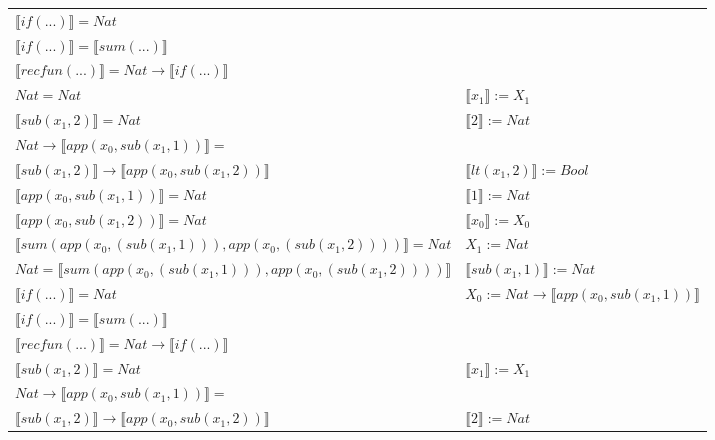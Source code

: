 \begin{exercise}
\begin{description}
\begin{center}
\begin{longtable}[!h]{ | l | l | }
                        $ \llbracket if(...) \rrbracket = Nat$ & \\
                        $ \llbracket if(...) \rrbracket =  \llbracket sum(...) \rrbracket$ & \\
                        $ \llbracket recfun(...) \rrbracket =   Nat  \to  \llbracket if(...) \rrbracket $& \\
                    \hline
                        $Nat = Nat$ &  $ \llbracket x_1 \rrbracket := X_1$ \\
                        $ \llbracket sub(x_1,2) \rrbracket = Nat$ & $ \llbracket 2 \rrbracket := Nat$  \\
                        $Nat \to  \llbracket app(x_0, sub(x_1,1)) \rrbracket = $ & \\
			     $ \llbracket sub(x_1,2) \rrbracket \to  \llbracket app(x_0, sub(x_1,2)) \rrbracket$ & $ \llbracket lt(x_1 , 2) \rrbracket := Bool$  \\
                        $ \llbracket app(x_0, sub(x_1,1)) \rrbracket = Nat$ &  $ \llbracket 1 \rrbracket := Nat$  \\
                        $ \llbracket app(x_0, sub(x_1,2)) \rrbracket = Nat$ & $ \llbracket x_0 \rrbracket := X_0$  \\
                        $ \llbracket sum(app(x_0, (sub(x_1,1))), app(x_0, (sub(x_1,2))))  \rrbracket = Nat$ &  $X_1 := Nat$ \\
                        $Nat =  \llbracket sum(app(x_0, (sub(x_1,1))), app(x_0, (sub(x_1,2)))) \rrbracket$ & $ \llbracket sub(x_1,1) \rrbracket := Nat$\\
                        $ \llbracket if(...) \rrbracket = Nat$ &     $X_0 := Nat \to  \llbracket app(x_0, sub(x_1,1)) \rrbracket$ \\
                        $ \llbracket if(...) \rrbracket =  \llbracket sum(...) \rrbracket$ & \\
                        $ \llbracket recfun(...) \rrbracket =   Nat  \to  \llbracket if(...) \rrbracket $ & \\
                    \hline
                        $ \llbracket sub(x_1,2) \rrbracket = Nat$ & $ \llbracket x_1 \rrbracket := X_1$  \\
                        $Nat \to  \llbracket app(x_0, sub(x_1,1)) \rrbracket =$ & \\ 
	             $ \llbracket sub(x_1,2) \rrbracket \to  \llbracket app(x_0, sub(x_1,2)) \rrbracket$ & $ \llbracket 2 \rrbracket := Nat$ \\

\end{longtable}
\end{center}
\end{description}
\end{exercise}
